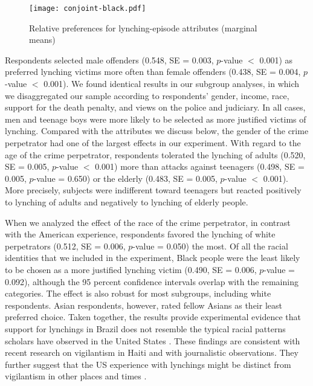 \documentclass[12pt,a4paper]{article}
\begin{document}
\begin{figure}[ht]
\texttt{[image: conjoint-black.pdf]}
\caption{Relative preferences for lynching-episode attributes (marginal means)}
\centering
\label{fig:exp01}
\end{figure}

Respondents selected male offenders (0.548, SE = 0.003, $p$-value $<$ 0.001) as preferred lynching victims more often than female offenders (0.438, SE = 0.004, $p$-value $<$ 0.001). We found identical results in our subgroup analyses, in which we disaggregated our sample according to respondents' gender, income, race, support for the death penalty, and views on the police and judiciary. In all cases, men and teenage boys were more likely to be selected as more justified victims of lynching. Compared with the attributes we discuss below, the gender of the crime perpetrator had one of the largest effects in our experiment. With regard to the age of the crime perpetrator, respondents tolerated the lynching of adults (0.520, SE = 0.005, $p$-value $<$ 0.001) more than attacks against teenagers (0.498, SE = 0.005, $p$-value = 0.650) or the elderly (0.483, SE = 0.005, $p$-value $<$ 0.001). More precisely, subjects were indifferent toward teenagers but reacted positively to lynching of adults and negatively to lynching of elderly people.

When we analyzed the effect of the race of the crime perpetrator, in contrast with the American experience, respondents favored the lynching of white perpetrators (0.512, SE = 0.006, $p$-value = 0.050) the most. Of all the racial identities that we included in the experiment, Black people were the least likely to be chosen as a more justified lynching victim (0.490, SE = 0.006, $p$-value = 0.092), although the 95 percent confidence intervals overlap with the remaining categories. The effect is also robust for most subgroups, including white respondents. Asian respondents, however, rated fellow Asians as their least preferred choice. Taken together, the results provide experimental evidence that support for lynchings in Brazil does not resemble the typical racial patterns scholars have observed in the United States \citep{dray2003hands,seguin2019national,obert2018keeping}. These findings are consistent with recent research on vigilantism in Haiti \citep{jung2020lynching} and with journalistic observations. They further suggest that the US experience with lynchings might be distinct from vigilantism in other places and times \citep{oliveira2016mob}. 
\end{document}
